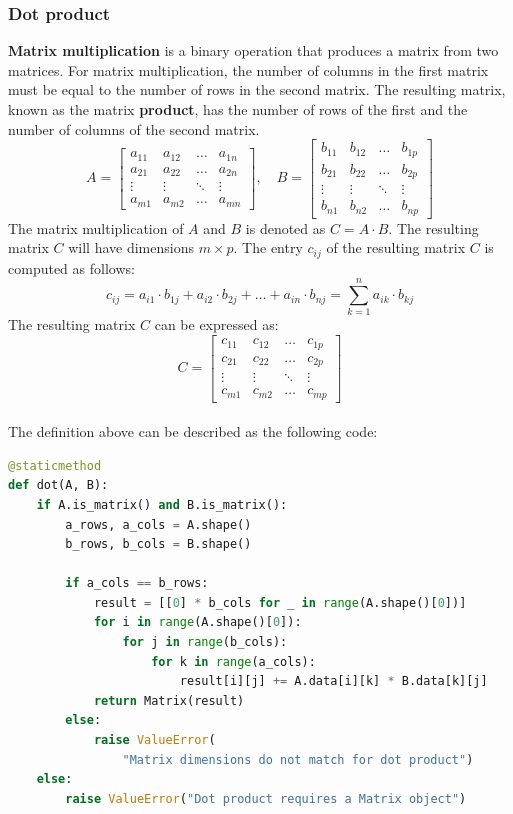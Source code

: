 \subsubsection{Dot product}
\textbf{Matrix multiplication} is a binary operation that produces a matrix from two matrices. For matrix multiplication, the number of columns in the first matrix must be equal to the number of rows in the second matrix. The resulting matrix, known as the matrix \textbf{product}, has the number of rows of the first and the number of columns of the second matrix.
$$
    A = \begin{bmatrix}
        a_{11} & a_{12} & \dots  & a_{1n} \\
        a_{21} & a_{22} & \dots  & a_{2n} \\
        \vdots & \vdots & \ddots & \vdots \\
        a_{m1} & a_{m2} & \dots  & a_{mn}
    \end{bmatrix}, \quad
    B = \begin{bmatrix}
        b_{11} & b_{12} & \dots  & b_{1p} \\
        b_{21} & b_{22} & \dots  & b_{2p} \\
        \vdots & \vdots & \ddots & \vdots \\
        b_{n1} & b_{n2} & \dots  & b_{np}
    \end{bmatrix}
$$
The matrix multiplication of $A$ and $B$ is denoted as $C = A \cdot B$. The resulting matrix $C$ will have dimensions $m \times p$. The entry $c_{ij}$ of the resulting matrix $C$ is computed as follows:
$$
    c_{ij} = a_{i1} \cdot b_{1j} + a_{i2} \cdot b_{2j} + \dots + a_{in} \cdot b_{nj} = \sum_{k=1}^{n} a_{ik} \cdot b_{kj}
$$
The resulting matrix $C$ can be expressed as:
$$
    C = \begin{bmatrix}
        c_{11} & c_{12} & \dots  & c_{1p} \\
        c_{21} & c_{22} & \dots  & c_{2p} \\
        \vdots & \vdots & \ddots & \vdots \\
        c_{m1} & c_{m2} & \dots  & c_{mp}
    \end{bmatrix}
$$
\\
The definition above can be described as the following code:
\begin{lstlisting}[language=Python, caption={Dot function}]
@staticmethod
def dot(A, B):
    if A.is_matrix() and B.is_matrix():
        a_rows, a_cols = A.shape()
        b_rows, b_cols = B.shape()

        if a_cols == b_rows:
            result = [[0] * b_cols for _ in range(A.shape()[0])]
            for i in range(A.shape()[0]):
                for j in range(b_cols):
                    for k in range(a_cols):
                        result[i][j] += A.data[i][k] * B.data[k][j]
            return Matrix(result)
        else:
            raise ValueError(
                "Matrix dimensions do not match for dot product")
    else:
        raise ValueError("Dot product requires a Matrix object")
\end{lstlisting}
